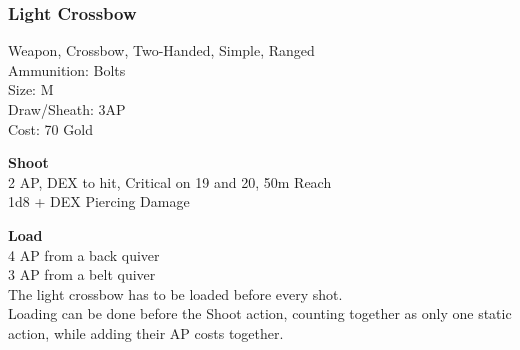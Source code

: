 \subsubsection{Light Crossbow}\label{weapon:lightCrossbow}
Weapon, Crossbow, Two-Handed, Simple, Ranged\\
Ammunition: Bolts\\
Size: M\\
Draw/Sheath: 3AP\\
Cost: 70 Gold

\textbf{Shoot} \\
2 AP, DEX to hit, Critical on 19 and 20, 50m Reach\\
1d8 + \texttimes DEX Piercing Damage

\textbf{Load} \\
4 AP from a back quiver\\
3 AP from a belt quiver\\
The light crossbow has to be loaded before every shot.\\
Loading can be done before the Shoot action, counting together as only one static action, while adding their AP costs together.\\